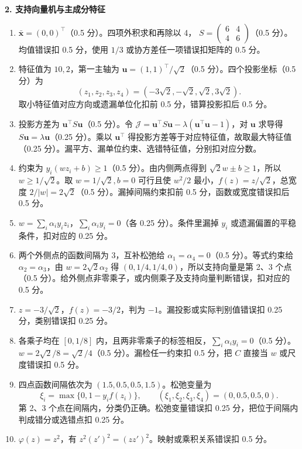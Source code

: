 \noindent\textbf{2. 支持向量机与主成分特征}
\begin{enumerate}[label=(\arabic*)]
\item $\bar{\bm x}=(0,0)^\top$（0.5 分）。四项外积求和再除以 4，
$S=\begin{pmatrix}6&4\\4&6\end{pmatrix}$（0.5 分）。均值错误扣 0.5 分，使用 $1/3$ 或协方差任一项错误扣矩阵的 0.5 分。
\item 特征值为 $10,2$，第一主轴为 $\bm u=(1,1)^\top/\sqrt{2}$（0.5 分）。四个投影坐标（0.5 分）为
\[
(z_1,z_2,z_3,z_4)=(-3\sqrt{2},-\sqrt{2},\sqrt{2},3\sqrt{2}).
\]
取小特征值对应方向或遗漏单位化扣前 0.5 分，错算投影扣后 0.5 分。
\item 投影方差为 $\bm u^\top S\bm u$（0.5 分）。令
$\mathcal J=\bm u^\top S\bm u-\lambda(\bm u^\top\bm u-1)$，对 $\bm u$ 求导得 $S\bm u=\lambda\bm u$（0.25 分）。乘以 $\bm u^\top$ 得投影方差等于对应特征值，故取最大特征值（0.25 分）。漏平方、漏单位约束、选错特征值，分别扣对应分数。
\item 约束为 $y_i(wz_i+b)\ge1$（0.5 分）。由内侧两点得到 $\sqrt{2}w\pm b\ge1$，所以 $w\ge1/\sqrt{2}$。取 $w=1/\sqrt{2}, b=0$ 可行且使 $w^2/2$ 最小，$f(z)=z/\sqrt{2}$，总宽度 $2/|w|=2\sqrt{2}$（0.5 分）。漏掉间隔约束扣前 0.5 分，函数或宽度错误扣后 0.5 分。
\item $w=\sum_i\alpha_i y_i z_i$，$\sum_i\alpha_i y_i=0$（各 0.25 分）。条件里漏掉 $y_i$ 或遗漏偏置的平稳条件，扣对应的 0.25 分。
\item 两个外侧点的函数间隔为 3，互补松弛给 $\alpha_1=\alpha_4=0$（0.5 分）。等式约束给 $\alpha_2=\alpha_3$，由 $w=2\sqrt{2}\alpha_2$ 得 $(0,1/4,1/4,0)$，所以支持向量是第 2、3 个点（0.5 分）。给外侧点非零乘子，或内侧乘子及支持向量判断错误，扣对应的 0.5 分。
\item $z=-3/\sqrt{2}$，$f(z)=-3/2$，判为 $-1$。漏投影或实际判别值错误扣 0.25 分，类别错误扣 0.25 分。
\item 各乘子均在 $[0,1/8]$ 内，且两非零乘子的标签相反，$\sum_i\alpha_iy_i=0$（0.5 分）。$w=2\sqrt{2}/8=\sqrt{2}/4$（0.5 分）。漏检任一约束扣 0.5 分，把 $C$ 直接当 $w$ 或尺度错误扣 0.5 分。
\item 四点函数间隔依次为 $(1.5,0.5,0.5,1.5)$。松弛变量为
\[
\xi_i=\max\{0,1-y_if(z_i)\},\qquad
(\xi_1,\xi_2,\xi_3,\xi_4)=(0,0.5,0.5,0).
\]
第 2、3 个点在间隔内，分类仍正确。松弛变量错误扣 0.25 分，把位于间隔内判成错分或选错点扣 0.25 分。
\item $\varphi(z)=z^2$，有 $z^2(z')^2=(zz')^2$。映射或乘积关系错误扣 0.5 分。
\end{enumerate}

